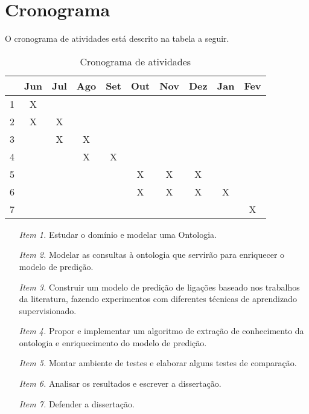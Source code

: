 \chapter{Cronograma}
\label{cap:cronograma}

O cronograma de atividades está descrito na tabela a seguir.

\begin{table}[h!]
    \centering
    \begin{tabular}{|c|c|c|c|c|c|c|c|c|c|}
     \hline
      & Jun & Jul & Ago & Set & Out & Nov & Dez & Jan & Fev \\
     \hline\hline
     1 & X &   &   &   &   &   &   &   &   \\
     \hline
     2 & X & X &   &   &   &   &   &   &   \\
     \hline
     3 &   & X & X &   &   &   &   &   &   \\
     \hline
     4 &   &   & X & X &   &   &   &   &   \\
     \hline
     5 &   &   &   &   & X & X & X &   &   \\
     \hline
     6 &   &   &   &   & X & X & X & X &   \\
     \hline
     7 &   &   &   &   &   &   &   &   & X \\
     \hline
    \end{tabular}
    \caption{Cronograma de atividades}
    \label{cronograma-atividades}
\end{table}

\begin{itemize}
    \item [\textit{Item 1.}] Estudar o domínio e modelar uma Ontologia.
    \item [\textit{Item 2.}] Modelar as consultas à ontologia que servirão para enriquecer o modelo de predição.
    \item [\textit{Item 3.}] Construir um modelo de predição de ligações baseado nos trabalhos da literatura, fazendo experimentos com diferentes técnicas de aprendizado supervisionado.
    \item [\textit{Item 4.}] Propor e implementar um algoritmo de extração de conhecimento da ontologia e enriquecimento do modelo de predição.
    \item [\textit{Item 5.}] Montar ambiente de testes e elaborar alguns testes de comparação.
    \item [\textit{Item 6.}] Analisar os resultados e escrever a dissertação.
    \item [\textit{Item 7.}] Defender a dissertação.

\end{itemize}
